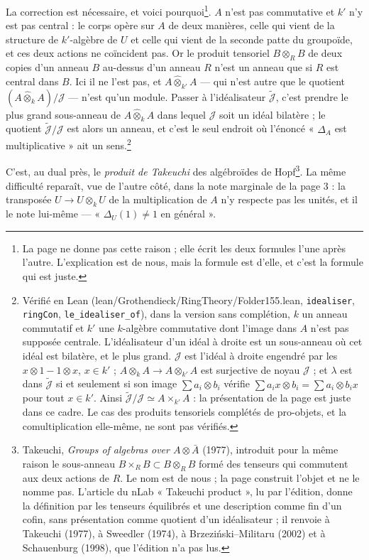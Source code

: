 \documentclass[11pt,a4paper]{article}
\begin{document}
La correction est nécessaire, et voici pourquoi\footnote{La page ne donne pas
cette raison ; elle écrit les deux formules l'une après l'autre. L'explication
est de nous, mais la formule est d'elle, et c'est la formule qui est juste.}.
$A$ n'est pas commutative et $k'$ n'y est pas central : le corps opère sur $A$
de deux manières, celle qui vient de la structure de $k'$-algèbre de $U$ et
celle qui vient de la seconde patte du groupoïde, et ces deux actions ne
coïncident pas. Or le produit tensoriel $B \otimes_{R} B$ de deux copies d'un
anneau $B$ au-dessus d'un anneau $R$ n'est un anneau que si $R$ est central
dans $B$. Ici il ne l'est pas, et $A \mathbin{\hat{\otimes}}_{k'} A$ — qui
n'est autre que le quotient $(A \mathbin{\hat{\otimes}}_{k} A)/\mathcal{J}$ —
n'est qu'un module. Passer à l'idéalisateur $\widetilde{\mathcal{J}}$, c'est
prendre le plus grand sous-anneau de $A \mathbin{\hat{\otimes}}_{k} A$ dans
lequel $\mathcal{J}$ soit un idéal bilatère ; le quotient
$\widetilde{\mathcal{J}}/\mathcal{J}$ est alors un anneau, et c'est le seul
endroit où l'énoncé « $\Delta_{A}$ est multiplicative » ait un sens.\footnote{Vérifié
en Lean (lean/Grothendieck/RingTheory/Folder155.lean, \texttt{idealiser},
\texttt{ringCon}, \texttt{le\_idealiser\_of}), dans la version sans
complétion, $k$ un anneau commutatif et $k'$ une $k$-algèbre commutative dont
l'image dans $A$ n'est pas supposée centrale. L'idéalisateur d'un idéal à droite
est un sous-anneau où cet idéal est bilatère, et le plus grand. $\mathcal{J}$
est l'idéal à droite engendré par les $x \otimes 1 - 1 \otimes x$, $x \in k'$ ;
$A \otimes_{k} A \to A \otimes_{k'} A$ est surjective de noyau $\mathcal{J}$ ; et
$\lambda$ est dans $\widetilde{\mathcal{J}}$ si et seulement si son image
$\sum a_i \otimes b_i$ vérifie $\sum a_i x \otimes b_i = \sum a_i \otimes b_i x$
pour tout $x \in k'$. Ainsi $\widetilde{\mathcal{J}}/\mathcal{J} \simeq A
\times_{k'} A$ : la présentation de la page est juste dans ce cadre. Le cas des
produits tensoriels complétés de pro-objets, et la comultiplication elle-même,
ne sont pas vérifiés.}

C'est, au dual près, le \emph{produit de Takeuchi} des algébroïdes de
Hopf\footnote{Takeuchi, \emph{Groups of algebras over $A \otimes \bar{A}$}
(1977), introduit pour la même raison le sous-anneau
$B \times_{R} B \subset B \otimes_{R} B$ formé des tenseurs qui commutent aux
deux actions de $R$. Le nom est de nous ; la page construit l'objet et ne le
nomme pas. L'article du nLab « Takeuchi product », lu par l'édition, donne la
définition par les tenseurs équilibrés et une description comme fin d'un cofin, sans
présentation comme quotient d'un idéalisateur ; il renvoie à Takeuchi (1977), à
Sweedler (1974), à Brzeziński--Militaru (2002) et à Schauenburg (1998), que l'édition
n'a pas lus.}. La même difficulté reparaît, vue de l'autre côté, dans la note
marginale de la page 3 : la transposée $U \to U \otimes_{k} U$ de la
multiplication de $A$ n'y respecte pas les unités, et il le note
lui-même — « $\Delta_{U}(1) \neq 1$ en général ».
\end{document}
